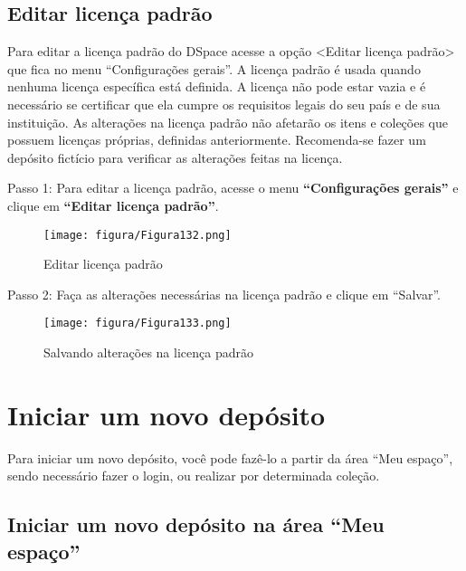 \documentclass[12pt,hidelinks]{article}
\begin{document}
    \subsection{Editar licença padrão}
    
    Para editar a licença padrão do DSpace acesse a opção <Editar licença padrão> que fica no menu “Configurações gerais”. A licença padrão é usada quando nenhuma licença específica está definida. A licença não pode estar vazia e é necessário se certificar que ela cumpre os requisitos legais do seu país e de sua instituição. As alterações na licença padrão não afetarão os itens e coleções que possuem licenças próprias, definidas anteriormente. Recomenda-se fazer um depósito fictício para verificar as alterações feitas na licença.
    
    \singlespacing
    
    Passo 1: Para editar a licença padrão, acesse o menu \textbf{“Configurações gerais”} e clique em \textbf{“Editar licença padrão”}. 
    
    \begin{figure}[!htp]
                \centering
                \texttt{[image: figura/Figura132.png]}
                \caption{Editar licença padrão}
            \label{Rotulo}
        \end{figure}
        
\newpage
    
    Passo 2: Faça as alterações necessárias na licença padrão e clique em “Salvar”.
    
    \begin{figure}[!htp]
                \centering
                \texttt{[image: figura/Figura133.png]}
                \caption{Salvando alterações na licença padrão}
            \label{Rotulo}
        \end{figure}

\newpage        
\section{Iniciar um novo depósito}
\newpage
    
    Para iniciar um novo depósito, você pode fazê-lo a partir da área “Meu espaço”, sendo necessário fazer o login, ou realizar por determinada coleção. 
    
    \subsection{Iniciar um novo depósito na área “Meu espaço”}
    
\end{document}
